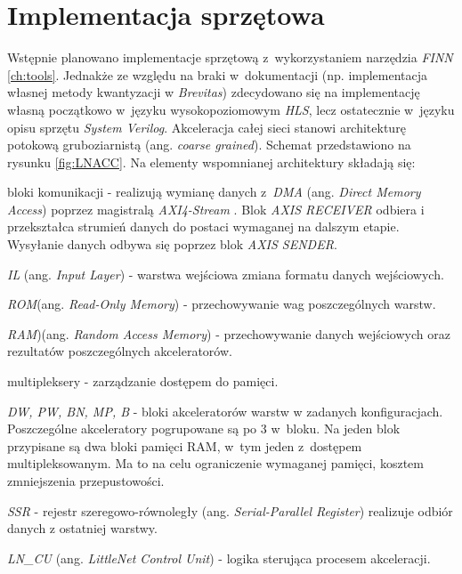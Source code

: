 \section{Implementacja sprzętowa}

Wstępnie planowano implementacje sprzętową z~wykorzystaniem narzędzia \emph{FINN} \ref{ch:tools}.
Jednakże ze względu na braki w~dokumentacji (np. implementacja własnej metody kwantyzacji w \emph{Brevitas}) zdecydowano się na implementację własną początkowo w~języku wysokopoziomowym \emph{HLS}, lecz ostatecznie w~języku opisu sprzętu \emph{System Verilog}.
Akceleracja całej sieci stanowi architekturę potokową gruboziarnistą (ang. \emph{coarse grained}).
Schemat przedstawiono na rysunku \ref{fig:LNACC}.
Na elementy wspomnianej architektury składają się:
\begin{description}
\item  bloki komunikacji - realizują wymianę danych z~\emph{DMA} (ang. \emph{Direct Memory Access}) \cite{dma} poprzez magistralą \emph{AXI4-Stream} \cite{axis}. 
Blok \emph{AXIS RECEIVER} odbiera i przekształca strumień danych do postaci wymaganej na dalszym etapie. Wysyłanie danych odbywa się poprzez blok \emph{AXIS SENDER}.
\item \emph{IL} (ang. \emph{Input Layer}) - warstwa wejściowa zmiana formatu danych wejściowych.
\item \emph{ROM}(ang. \emph{Read-Only Memory}) - przechowywanie wag poszczególnych warstw.
\item \emph{RAM})(ang. \emph{Random Access Memory}) - przechowywanie danych wejściowych oraz rezultatów poszczególnych akceleratorów.
\item multipleksery - zarządzanie dostępem do pamięci.
\item \emph{DW, PW, BN, MP, B} - bloki akceleratorów warstw w zadanych konfiguracjach.
Poszczególne akceleratory pogrupowane są po 3 w~bloku. 
Na jeden blok przypisane są dwa bloki pamięci RAM, w~tym jeden z~dostępem  multipleksowanym.
Ma to na celu ograniczenie wymaganej pamięci, kosztem zmniejszenia przepustowości. 
\item \emph{SSR} - rejestr szeregowo-równoległy (ang. \emph{Serial-Parallel Register}) realizuje odbiór danych z ostatniej warstwy.
\item \emph{LN\_CU} (ang. \emph{LittleNet Control Unit}) -  logika sterująca procesem akceleracji.
\end{description}


